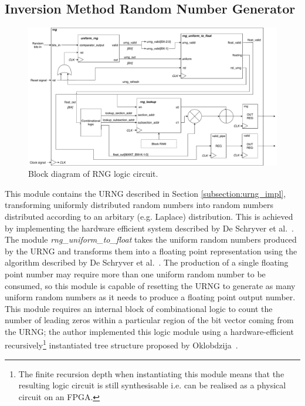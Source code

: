 \documentclass[12pt]{article}
\begin{document}
      \subsection{Inversion Method Random Number Generator} \label{subsection:rng_impl}
        \begin{figure}[H]
          \centering
          \includegraphics[width=\textwidth]{fig/rng.pdf}
          \caption{Block diagram of RNG logic circuit.}
          \label{fig:rng_block_diagram}
        \end{figure}

        This module contains the URNG described in Section \ref{subsection:urng_impl}, transforming uniformly distributed random numbers into random numbers distributed according to an arbitary (e.g. Laplace) distribution. This is achieved by implementing the hardware efficient system described by De Schryver et al.~\cite{DeSchryver}.\\

        The module \textit{rng\_uniform\_to\_float} takes the uniform random numbers produced by the URNG and transforms them into a floating point representation using the algorithm described by De Schryver et al.~\cite{DeSchryver}. The production of a single floating point number may require more than one uniform random number to be consumed, so this module is capable of resetting the URNG to generate as many uniform random numbers as it needs to produce a floating point output number. This module requires an internal block of combinational logic to count the number of leading zeros within a particular region of the bit vector coming from the URNG; the author implemented this logic module using a hardware-efficient recursively\footnote{The finite recursion depth when instantiating this module means that the resulting logic circuit is still synthesisable i.e. can be realised as a physical circuit on an FPGA.} instantiated tree structure proposed by Oklobdzija~\cite{clz}.\\
\end{document}
